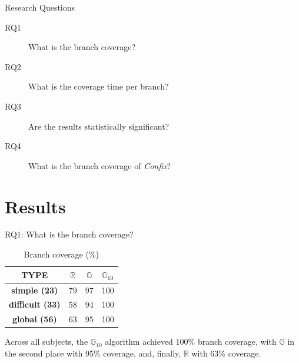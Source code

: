 \documentclass{beamer}
\newcommand{\Random}{\mathbb{R}}
\newcommand{\Genetic}{\mathbb{G}}
\newcommand{\RGenetic}{\mathbb{G}_{10}}
\begin{document}
\begin{frame}{Research Questions}
\begin{description}
\item[RQ1] What is the branch coverage?
\item[RQ2] What is the coverage time per branch?
\item[RQ3] Are the results statistically significant?
\item[RQ4] What is the branch coverage of \emph{Confix}?
\end{description}
\end{frame}

\section{Results}

\begin{frame}{RQ1: What is the branch coverage?}
  
  \begin{table}
    \footnotesize
    \caption{Branch coverage (\%)}
    \begin{tabular}{c|ccc}
      \toprule
      \textbf{TYPE}  & $\Random$  & $\Genetic$ & $\RGenetic$\\
        \midrule
      \textbf{simple (23)}    & 79 & 97 & 100  \\
      \textbf{difficult (33)} & 58 & 94 & 100 \\
      \midrule
      \textbf{global (56)}    & 63 & 95 & 100 \\
      \bottomrule
    \end{tabular}
  \end{table}

  \begin{block}{}
    Across all subjects, the $\RGenetic$ algorithm achieved 100\% branch coverage, with $\Genetic$ in the second place with 95\% coverage, and, finally, $\Random$ with  63\% coverage.
  \end{block}
 
\end{frame}
\end{document}

